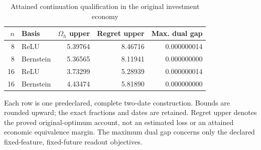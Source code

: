 \begin{table}[htbp]
\centering
\caption{Attained continuation qualification in the original investment economy}\label{tab:qualification73}
{\small\setlength{\tabcolsep}{4pt}
\begin{tabular}{rlrrr}
\hline
$n$ & Basis & $\Omega_h$ upper & Regret upper & Max. dual gap \\
\hline
8 & ReLU & 5.39764 & 8.46716 & 0.000000014 \\
8 & Bernstein & 5.36565 & 8.11941 & 0.000000000 \\
16 & ReLU & 3.73299 & 5.28939 & 0.000000014 \\
16 & Bernstein & 4.43474 & 5.81890 & 0.000000000 \\
\hline
\end{tabular}}
\par\smallskip
{\footnotesize Each row is one predeclared, complete two-date construction. Bounds are rounded upward; the exact fractions and dates are retained. Regret upper denotes the proved original-optimum account, not an estimated loss or an attained economic equivalence margin. The maximum dual gap concerns only the declared fixed-feature, fixed-future readout objectives.}
\end{table}
